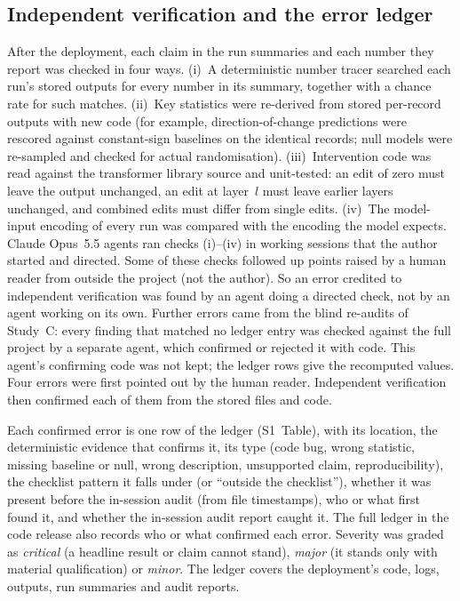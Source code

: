 \subsection*{Independent verification and the error ledger}
After the deployment, each claim in the run summaries and each number
they report was checked in four ways. (i)~A deterministic number tracer
searched each run's stored outputs for every number in its summary,
together with a chance rate for such matches. (ii)~Key statistics were
re-derived from stored per-record outputs with new code (for example,
direction-of-change predictions were rescored against constant-sign
baselines on the identical records; null models were re-sampled and
checked for actual randomisation). (iii)~Intervention code was read
against the transformer library source and unit-tested: an edit of zero
must leave the output unchanged, an edit at layer~$l$ must leave earlier
layers unchanged, and combined edits must differ from single edits.
(iv)~The model-input encoding of every run was compared with the
encoding the model expects. Claude Opus~5.5 agents ran checks (i)--(iv)
in working sessions that the author started and directed. Some of these
checks followed up points raised by a human reader from outside the
project (not the author). So an error credited to independent verification was found
by an agent doing a directed check, not by an agent working on its own.
Further errors came from the blind re-audits
of Study~C: every finding that matched no ledger entry was checked against
the full project by a separate agent, which confirmed or rejected it with
code. This agent's confirming code was not kept; the ledger rows give
the recomputed values. Four errors were first pointed out by the human reader.
Independent verification then confirmed each of them from the stored
files and code.

Each confirmed error is one row of the ledger (S1~Table), with its
location, the deterministic evidence that confirms it, its type (code
bug, wrong statistic, missing baseline or null, wrong description,
unsupported claim, reproducibility), the checklist pattern it falls
under (or ``outside the checklist''), whether it was present before the
in-session audit (from file timestamps), who or what first found it, and
whether the in-session audit report caught it. The full ledger in the code
release also records who or what confirmed each error. Severity was graded as \emph{critical} (a headline result or claim cannot
stand), \emph{major} (it stands only with material qualification) or
\emph{minor}. The ledger covers the deployment's code, logs, outputs, run
summaries and audit reports.

